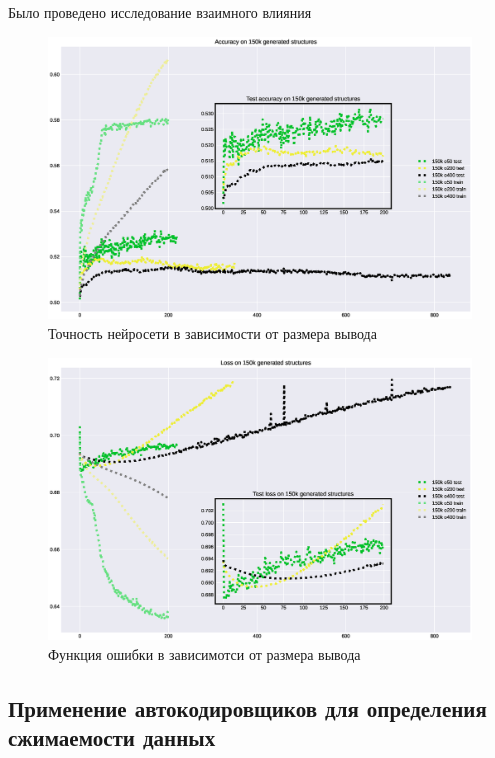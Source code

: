 \documentclass{article}
\begin{document}
Было проведено исследование взаимного влияния 

\begin{figure}[!htp]
\centering
\includegraphics[width=\linewidth]{imgs/acc-part_out.eps}
\caption{Точность нейросети в зависимости от размера вывода}
\label{fig:acc_pout}
\end{figure}


\begin{figure}[!htp]
\centering
\includegraphics[scale=0.50]{imgs/loss-part_out.eps}
\caption{Функция ошибки в зависимотси от размера вывода}
\label{fig:loss_pout}
\end{figure}


\subsection{Применение автокодировщиков для определения сжимаемости данных}
\end{document}
